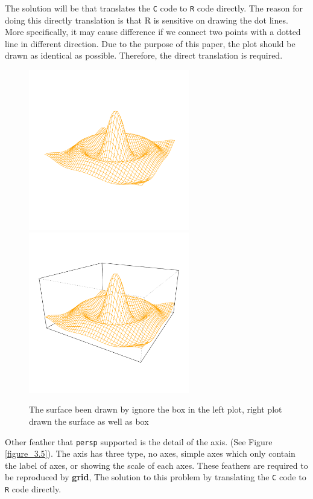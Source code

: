 \documentclass[11pt,twoside]{report}
\begin{document}
The solution will be that translates the \texttt{C} code to \texttt{R} code directly. The reason for doing this directly translation is that R is sensitive on drawing the dot lines. More specifically, it may cause difference if we connect two points with a dotted line in different direction. Due to the purpose of this paper, the plot should be drawn as identical as possible. Therefore, the direct translation is required.\\
\begin{figure}[h]
	\begin{center}
		\includegraphics[height = 7cm, width = 7cm]{figure/box_example_1.pdf}
		\includegraphics[height = 7cm, width = 7cm]{figure/box_example_2.pdf}
		\caption{The surface been drawn by ignore the box in the left plot, right plot drawn the surface as well as box}
		\label{figure_3.4}
	\end{center}
\end{figure}

Other feather that \texttt{persp} supported is the detail of the axis. (See Figure \ref{figure_3.5}). The axis has three type, no axes, simple axes which only contain the label of axes, or showing the scale of each axes. These feathers are required to be reproduced by \textbf{grid}, The solution to this problem by translating the \texttt{C} code to \texttt{R} code directly.
\end{document}

